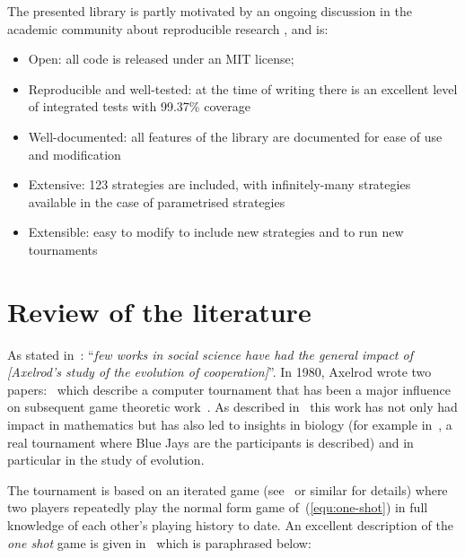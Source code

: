 \documentclass{jors}
\begin{document}
The presented library is partly motivated by an ongoing discussion in the academic community
about reproducible research \cite{Crick2014a, Hong2015a, Prlic2012, Sandve2013},
and is:

\begin{itemize}[noitemsep,topsep=0pt]
    \item Open: all code is released under an MIT license;
    \item Reproducible and well-tested: at the time of writing there is an excellent level of
        integrated tests with 99.37\% coverage
    \item Well-documented: all features of the library are documented for ease of
        use and modification
    \item Extensive: 123 strategies are included, with infinitely-many
        strategies available in the case of parametrised strategies
    \item Extensible: easy to modify to include new strategies and to run new tournaments
\end{itemize}

\section*{Review of the literature}\label{sec:review}

As stated in~\cite{Bendor1991}: ``\textit{few works in social science have had
the general impact of [Axelrod's study of the evolution of cooperation]}''.  In
1980, Axelrod wrote two papers:~\cite{Axelrod1980a,Axelrod1980b} which
describe a computer tournament that has been a major influence on
subsequent game theoretic work~\cite{Banks1990, Bendor1991, Boyd1987, Chellapilla1999,
DavidB1993, Doebeli2005, Ellison1994, Gotts2003, Hilbe2013, Isaac2008,
Kraines1989, Lee2015, Lorberbaum1994, Milgrom1982, Molander1985, Murnighan2015,
Press2012, Stephens2002, Stewart2012}. As described in~\cite{Bendor1991} this
work has not only had impact in mathematics but has also led to insights in
biology (for example in~\cite{Stephens2002}, a real tournament where Blue Jays
are the participants is described) and in particular in the study of evolution.

The tournament is based on an iterated game (see~\cite{Maschler2013} or similar
for details) where two players repeatedly play the normal form game
of~(\ref{equ:one-shot}) in full knowledge of each other's playing history to
date.  An excellent description of the \textit{one shot} game is given
in~\cite{Gotts2003} which is paraphrased below:
\end{document}
